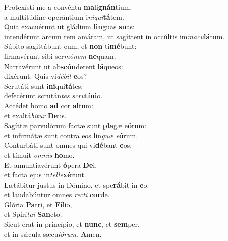\evenverse Protexísti me a convéntu \textbf{ma}li\textbf{gnán}tium:~\*\\
\evenverse a multitúdine operántium i\textit{ni}\textit{qui}\textbf{tá}tem.\\
\oddverse Quia exacuérunt ut gládium \textbf{lin}guas \textbf{su}as:~\*\\
\oddverse intendérunt arcum rem amáram, ut sagíttent in occúltis im\textit{ma}\textit{cu}\textbf{lá}tum.\\
\evenverse Súbito sagittábunt eum, et \textbf{non} ti\textbf{mé}bunt:~\*\\
\evenverse firmavérunt sibi ser\textit{mó}\textit{nem} \textbf{ne}quam.\\
\oddverse Narravérunt ut ab\textbf{scón}derent \textbf{lá}queos:~\*\\
\oddverse dixérunt: Quis vi\textit{dé}\textit{bit} \textbf{e}os?\\
\evenverse Scrutáti sunt i\textbf{ni}qui\textbf{tá}tes:~\*\\
\evenverse defecérunt scrután\textit{tes} \textit{scru}\textbf{tí}\textbf{ni}o.\\
\oddverse Accédet homo \textbf{ad} cor \textbf{al}tum:~\*\\
\oddverse et exaltá\textit{bi}\textit{tur} \textbf{De}us.\\
\evenverse Sagíttæ parvulórum factæ sunt \textbf{pla}gæ e\textbf{ó}rum:~\*\\
\evenverse et infirmátæ sunt contra eos lin\textit{guæ} \textit{e}\textbf{ó}rum.\\
\oddverse Conturbáti sunt omnes qui vi\textbf{dé}bant \textbf{e}os:~\*\\
\oddverse et tímuit \textit{om}\textit{nis} \textbf{ho}mo.\\
\evenverse Et annuntiavérunt \textbf{ó}pera \textbf{De}i,~\*\\
\evenverse et facta ejus in\textit{tel}\textit{le}\textbf{xé}runt.\\
\oddverse Lætábitur justus in Dómino, et spe\textbf{rá}bit in \textbf{e}o:~\*\\
\oddverse et laudabúntur omnes \textit{re}\textit{cti} \textbf{cor}de.\\
\evenverse Glória \textbf{Pa}tri, et \textbf{Fí}lio,~\*\\
\evenverse et Spirí\textit{tu}\textit{i} \textbf{San}cto.\\
\oddverse Sicut erat in princípio, et \textbf{nunc}, et \textbf{sem}per,~\*\\
\oddverse et in sǽcula sæcu\textit{ló}\textit{rum}. \textbf{A}men.\\
